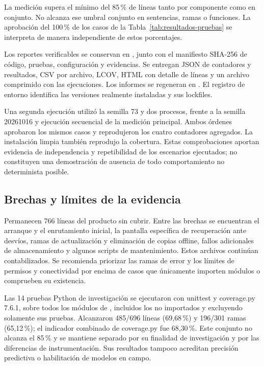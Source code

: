 La medición supera el mínimo del 85\,\% de líneas tanto por componente como en conjunto. No alcanza ese umbral conjunto en sentencias, ramas o funciones. La aprobación del 100\,\% de los casos de la Tabla~\ref{tab:resultados-pruebas} se interpreta de manera independiente de estos porcentajes.

Los reportes verificables se conservan en , junto con el manifiesto SHA-256 de código, pruebas, configuración y evidencias. Se entregan JSON de contadores y resultados, CSV por archivo, LCOV, HTML con detalle de líneas y un archivo comprimido con las ejecuciones. Los informes se regeneran en . El registro de entorno identifica las versiones realmente instaladas y sus lockfiles.

Una segunda ejecución utilizó la semilla 73 y dos procesos, frente a la semilla 20261016 y ejecución secuencial de la medición principal. Ambos órdenes aprobaron los mismos casos y reprodujeron los cuatro contadores agregados. La instalación limpia también reprodujo la cobertura. Estas comprobaciones aportan evidencia de independencia y repetibilidad de los escenarios ejecutados; no constituyen una demostración de ausencia de todo comportamiento no determinista posible.

\subsection{Brechas y límites de la evidencia}

Permanecen 766 líneas del producto sin cubrir. Entre las brechas se encuentran el arranque y el enrutamiento inicial, la pantalla específica de recuperación ante desvíos, ramas de actualización y eliminación de copias offline, fallos adicionales de almacenamiento y algunos scripts de mantenimiento. Estos archivos continúan contabilizados. Se recomienda priorizar las ramas de error y los límites de permisos y conectividad por encima de casos que únicamente importen módulos o comprueben su existencia.

Las 14 pruebas Python de investigación se ejecutaron con unittest y coverage.py 7.6.1, sobre todos los módulos de , incluidos los no importados y excluyendo solamente sus pruebas. Alcanzaron 485/696 líneas (69{,}68\,\%) y 196/301 ramas (65{,}12\,\%); el indicador combinado de coverage.py fue 68{,}30\,\%. Este conjunto no alcanza el 85\,\% y se mantiene separado por su finalidad de investigación y por las diferencias de instrumentación. Sus resultados tampoco acreditan precisión predictiva o habilitación de modelos en campo.

